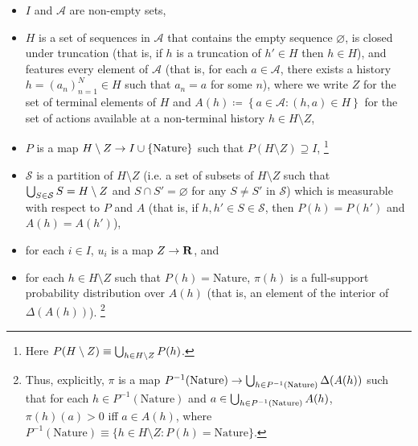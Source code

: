 \documentclass[11pt,letterpaper,reqno,oneside]{book}
\begin{document}
\begin{itemize}

	\item $I$ and $\mathcal{A}$ are non-empty sets,

	\item $H$ is a set of sequences in $\mathcal{A}$ that contains the empty sequence $\varnothing$, is closed under truncation (that is, if $h$ is a truncation of $h' \in H$ then $h \in H$), and features every element of $\mathcal{A}$ (that is, for each $a \in \mathcal{A}$, there exists a history $h = (a_n)_{n=1}^N \in H$ such that $a_n = a$ for some $n$), where we write $Z$ for the set of terminal elements of $H$ and $A(h) \coloneqq \left\{ a \in \mathcal{A} : (h,a) \in H \right\}$ for the set of actions available at a non-terminal history $h \in H \setminus Z$,

	\item $P$ is a map $H \setminus Z \to I \cup \{\text{Nature}\}$ such that $P(H \setminus Z) \supseteq I$,%
		\footnote{Here $P(H \setminus Z) \equiv \bigcup_{h \in H \setminus Z} P(h)$.}

	\item $\mathcal{S}$ is a partition of $H \setminus Z$ (i.e. a set of subsets of $H \setminus Z$ such that $\bigcup_{S \in \mathcal{S}} S = H \setminus Z$ and $S \cap S' = \varnothing$ for any $S \neq S'$ in $\mathcal{S}$) which is measurable with respect to $P$ and $A$ (that is, if $h,h' \in S \in \mathcal{S}$, then $P(h)=P(h')$ and $A(h)=A(h')$),

	\item for each $i \in I$, $u_i$ is a map $Z \to \mathbf{R}$, and

	\item for each $h \in H \setminus Z$ such that $P(h) = \text{Nature}$, $\pi(h)$ is a full-support probability distribution over $A(h)$ (that is, an element of the interior of $\Delta(A(h))$).%
		\footnote{Thus, explicitly, $\pi$ is a map $P^{-1}(\text{Nature}) \to \bigcup_{h \in P^{-1}(\text{Nature})} \Delta(A(h))$ such that for each $h \in P^{-1}(\text{Nature})$ and $a \in \bigcup_{h \in P^{-1}(\text{Nature})} A(h)$, $\pi(h)(a)>0$ iff $a \in A(h)$, where $P^{-1}(\text{Nature}) \equiv \{ h \in H \setminus Z : P(h) = \text{Nature} \}$.}

\end{itemize}
%
\end{document}
